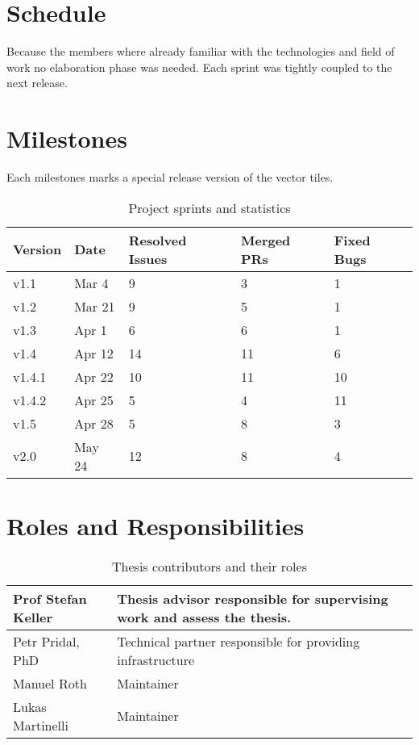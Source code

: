 \section{Schedule}

Because the \osmvt{} members where already familiar with the technologies and field of work no elaboration phase was needed. Each sprint was tightly coupled to the next release.

\section{Milestones}

Each milestones marks a special release version of the vector tiles.

\begin{table}[H]
\centering
    \begin{tabular}{p{1.5cm} p{1.5cm} p{1.5cm} p{1.5cm} p{1.5cm}}
    Version & Date  & Resolved Issues & Merged PRs & Fixed Bugs\\
    \hline
    v1.1   & Mar 4  & 9 & 3 & 1 \\
    v1.2   & Mar 21 & 9 & 5 & 1 \\
    v1.3   & Apr 1  & 6 & 6 & 1 \\
    v1.4   & Apr 12 & 14 & 11 & 6 \\
    v1.4.1 & Apr 22 & 10 & 11 & 10 \\
    v1.4.2 & Apr 25 & 5 & 4 & 11 \\
    v1.5   & Apr 28 & 5 & 8 & 3 \\
    v2.0   & May 24 & 12 & 8 & 4 \\
    \end{tabular}
    \caption[Milestones]{Project sprints and statistics}
\end{table}

\section{Roles and Responsibilities}\label{roles-and-responsibilities}

\begin{table}[H]
\centering
    \begin{tabular}{p{3cm} p{9.5cm}}
Prof Stefan Keller & Thesis advisor responsible for supervising work and
assess the thesis.\\ \hline
Petr Pridal, PhD &
Technical partner responsible for providing infrastructure \\ \hline
Manuel Roth &
Maintainer\\ \hline
Lukas Martinelli &
Maintainer\\ \hline
    \end{tabular}
    \caption{Thesis contributors and their roles}
\end{table}

